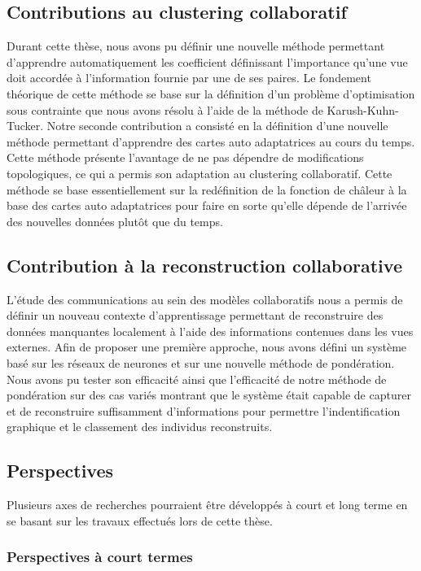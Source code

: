 \subsection{Contributions au clustering collaboratif}

Durant cette thèse, nous avons pu définir une nouvelle méthode permettant d'apprendre automatiquement les coefficient définissant l'importance qu'une vue doit accordée à l'information fournie par une de ses paires. Le fondement théorique de cette méthode se base sur la définition d'un problème d'optimisation sous contrainte que nous avons résolu à l'aide de la méthode de Karush-Kuhn-Tucker.
Notre seconde contribution a consisté en la définition d'une nouvelle méthode permettant d'apprendre des cartes auto adaptatrices au cours du temps. Cette méthode présente l'avantage de ne pas dépendre de modifications topologiques, ce qui a permis son adaptation au clustering collaboratif. Cette méthode se base essentiellement sur la redéfinition de la fonction de châleur à la base des cartes auto adaptatrices pour faire en sorte qu'elle dépende de l'arrivée des nouvelles données plutôt que du temps.

\subsection{Contribution à la reconstruction collaborative}

L'étude des communications au sein des modèles collaboratifs nous a permis de définir un nouveau contexte d'apprentissage permettant de reconstruire des données manquantes localement à l'aide des informations contenues dans les vues externes. Afin de proposer une première approche, nous avons défini un système basé sur les réseaux de neurones et sur une nouvelle méthode de pondération. Nous avons pu tester son efficacité ainsi que l'efficacité de notre méthode de pondération sur des cas variés montrant que le système était capable de capturer et de reconstruire suffisamment d'informations pour permettre l'indentification graphique et le classement des individus reconstruits.

\subsection{Perspectives}

Plusieurs axes de recherches pourraient \^{e}tre développés à court et long terme en se basant sur les travaux effectués lors de cette thèse. 

\subsubsection{Perspectives à court termes}

